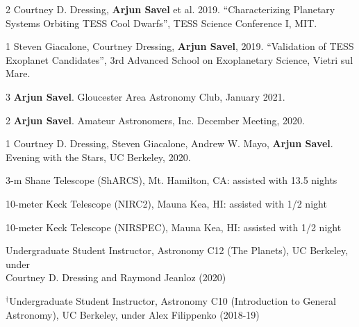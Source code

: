 \documentclass[12pt,letterpaper]{article}
\begin{document}
\begin{list}{}{\cvlist}
\item[{\color{numcolor}\scriptsize2}] Courtney D. Dressing, \textbf{Arjun Savel} et al. 2019. “Characterizing Planetary Systems Orbiting TESS Cool Dwarfs”, TESS Science Conference I, MIT.

\item[{\color{numcolor}\scriptsize1}] Steven Giacalone, Courtney Dressing, \textbf{Arjun Savel}, 2019. “Validation of TESS Exoplanet Candidates”, 3rd Advanced School on Exoplanetary Science, Vietri sul Mare.

\end{list}

\begin{list}{}{\cvlist}
\item[{\color{numcolor}\scriptsize3}] \textbf{Arjun Savel}. Gloucester Area Astronomy Club, January 2021.
\item[{\color{numcolor}\scriptsize2}] \textbf{Arjun Savel}. Amateur Astronomers, Inc. December Meeting, 2020.
\item[{\color{numcolor}\scriptsize1}] Courtney D. Dressing, Steven Giacalone, Andrew W. Mayo, \textbf{Arjun Savel}. Evening with the Stars, UC Berkeley, 2020.
\end{list}



\begin{list}{}{\cvlist}

\item 3-m Shane Telescope (ShARCS), Mt. Hamilton, CA: assisted with 13.5 nights
\item 10-meter Keck Telescope (NIRC2), Mauna Kea, HI: assisted with 1/2 night
\item 10-meter Keck Telescope (NIRSPEC), Mauna Kea, HI: assisted with 1/2 night

\end{list}


\begin{list}{}{\cvlist}
\item Undergraduate Student Instructor, Astronomy C12 (The Planets), UC Berkeley, under \\ Courtney D. Dressing and Raymond Jeanloz (2020)
\item $^\dagger$Undergraduate Student Instructor, Astronomy C10 (Introduction to General \\ Astronomy), UC Berkeley, under Alex Filippenko (2018-19)
\end{list}
\end{document}
